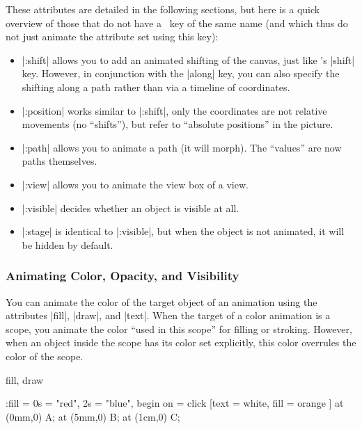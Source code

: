 These attributes are detailed in the following sections, but here is a
quick overview of those that do not have a \tikzname\ key of the same
name (and which thus do not just animate the attribute set using this
key):  
\begin{itemize}
\item |:shift| allows you to add an animated shifting of the
  canvas, just like \tikzname's |shift| key. However, in conjunction
  with the |along| key, you can also specify the shifting along a path
  rather than via a timeline of coordinates.
\item |:position| works similar to |:shift|, only the coordinates are
  not relative movements (no ``shifts''), but refer to ``absolute
  positions'' in the picture.
\item |:path| allows you to animate a path (it will
  morph). The ``values'' are now paths themselves. 
\item |:view| allows you to animate the view box of a view.
\item |:visible| decides whether  an object is visible at all. 
\item |:stage| is identical to |:visible|, but when the object is not
  animated, it will be hidden by default.
\end{itemize}



\subsubsection{Animating Color, Opacity, and Visibility}
\label{section-animation-painting}

You can animate the color of the target object of an animation using
the attributes |fill|, |draw|, and |text|. When the target of a color
animation is a scope, you animate the color ``used in this scope'' for
filling or stroking. However, when an object inside the scope has its
color set explicitly, this color overrules the color of the scope.

\begin{tikzanimateattribute}{fill, draw}
\begin{codeexample}[animation list={0.5,1,1.5,2}]
\tikz :fill = {0s = "red", 2s = "blue", begin on = click}
      [text = white, fill = orange ] {
  \node [fill]                   at (0mm,0) {A};
  \node [fill]                   at (5mm,0) {B};
  \node [fill = green!50!black ] at (1cm,0) {C};
}
\end{codeexample}
\end{tikzanimateattribute}

